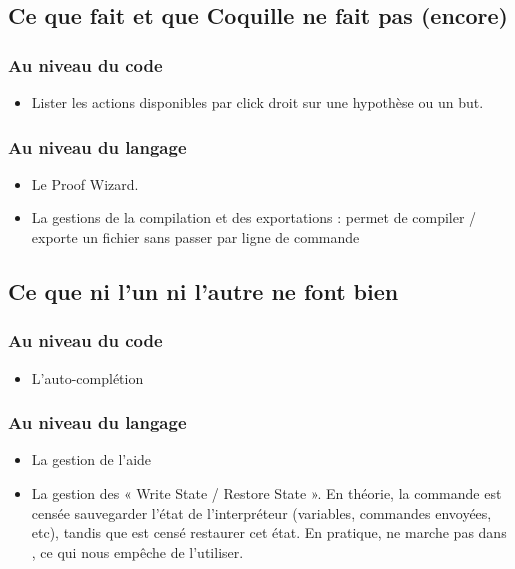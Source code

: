     \subsection{Ce que \coqide fait et que Coquille ne fait pas (encore)}
    
        \subsubsection{Au niveau du code}

            \begin{itemize}
                \item Lister les actions disponibles par click droit sur une hypothèse ou un but.
            \end{itemize}

        \subsubsection{Au niveau du langage}
        
            \begin{itemize}
                \item Le Proof Wizard.
                \item La gestions de la compilation et des exportations : \coqide permet de compiler / exporte un fichier sans passer par ligne de commande
            \end{itemize}

    \subsection{Ce que ni l'un ni l'autre ne font bien}

        \subsubsection{Au niveau du code}

            \begin{itemize}
                \item L'auto-complétion
            \end{itemize}

        \subsubsection{Au niveau du langage}
        
            \begin{itemize}
                \item La gestion de l'aide
                \item La gestion des « Write State / Restore State ».
                En théorie, la commande  est censée sauvegarder l'état de l'interpréteur (variables, commandes envoyées, etc), tandis que  est censé restaurer cet état.
			    En pratique,  ne marche pas dans \coqtop, ce qui nous empêche de l'utiliser.
            \end{itemize}

